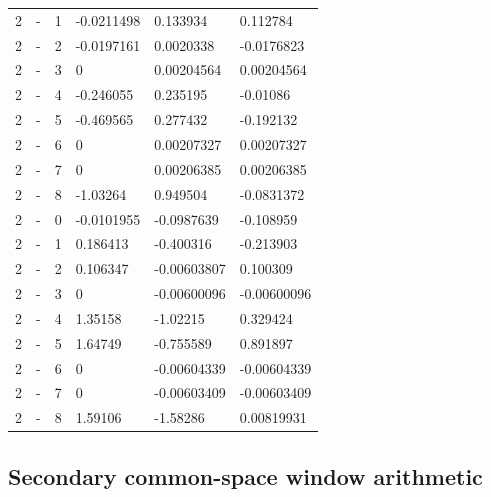 \begin{longtable}
{}2 & - & 1 & -0.0211498 & 0.133934 & 0.112784 \\
{}2 & - & 2 & -0.0197161 & 0.0020338 & -0.0176823 \\
{}2 & - & 3 & 0 & 0.00204564 & 0.00204564 \\
{}2 & - & 4 & -0.246055 & 0.235195 & -0.01086 \\
{}2 & - & 5 & -0.469565 & 0.277432 & -0.192132 \\
{}2 & - & 6 & 0 & 0.00207327 & 0.00207327 \\
{}2 & - & 7 & 0 & 0.00206385 & 0.00206385 \\
{}2 & - & 8 & -1.03264 & 0.949504 & -0.0831372 \\
{}2 & \allowbreak{}-\allowbreak{} & 0 & -0.0101955 & -0.0987639 & -0.108959 \\
{}2 & \allowbreak{}-\allowbreak{} & 1 & 0.186413 & -0.400316 & -0.213903 \\
{}2 & \allowbreak{}-\allowbreak{} & 2 & 0.106347 & -0.00603807 & 0.100309 \\
{}2 & \allowbreak{}-\allowbreak{} & 3 & 0 & -0.00600096 & -0.00600096 \\
{}2 & \allowbreak{}-\allowbreak{} & 4 & 1.35158 & -1.02215 & 0.329424 \\
{}2 & \allowbreak{}-\allowbreak{} & 5 & 1.64749 & -0.755589 & 0.891897 \\
{}2 & \allowbreak{}-\allowbreak{} & 6 & 0 & -0.00604339 & -0.00604339 \\
{}2 & \allowbreak{}-\allowbreak{} & 7 & 0 & -0.00603409 & -0.00603409 \\
{}2 & \allowbreak{}-\allowbreak{} & 8 & 1.59106 & -1.58286 & 0.00819931 \\
\end{longtable}\endgroup


\subsection{Secondary common-space window arithmetic}
\label{app:audit10-common}

